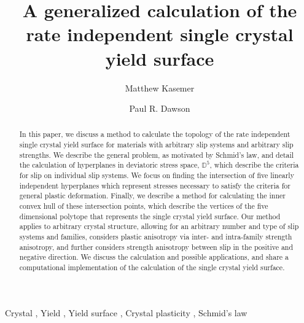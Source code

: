 \documentclass[preprint,3p,times,sort&compress,letterpaper,12pt]{elsarticle} %
\begin{document}
\begin{frontmatter}


\title{A generalized calculation of the rate independent single crystal yield surface}

\author[1]{Matthew Kasemer}
\author[2]{Paul R. Dawson}


\address[1]{Department of Mechanical Engineering, The University of Alabama, Tuscaloosa, AL 35487}
\address[2]{Sibley School of Mechanical and Aerospace Engineering, Cornell University, Ithaca, NY 14850}

\begin{abstract}
In this paper, we discuss a method to calculate the topology of the rate independent single crystal yield surface for materials with arbitrary slip systems and arbitrary slip strengths. We describe the general problem, as motivated by Schmid's law, and detail the calculation of hyperplanes in deviatoric stress space, $\mathbb{D}^5$, which describe the criteria for slip on individual slip systems. We focus on finding the intersection of five linearly independent hyperplanes which represent stresses necessary to satisfy the criteria for general plastic deformation. Finally, we describe a method for calculating the inner convex hull of these intersection points, which describe the vertices of the five dimensional polytope that represents the single crystal yield surface. Our method applies to arbitrary crystal structure, allowing for an arbitrary number and type of slip systems and families, considers plastic anisotropy via inter- and intra-family strength anisotropy, and further considers strength anisotropy between slip in the positive and negative direction. We discuss the calculation and possible applications, and share a computational implementation of the calculation of the single crystal yield surface.
\end{abstract}

\begin{keyword}
Crystal \sep
Yield \sep
Yield surface \sep
Crystal plasticity \sep
Schmid's law
\end{keyword}

\end{frontmatter}
\end{document}
